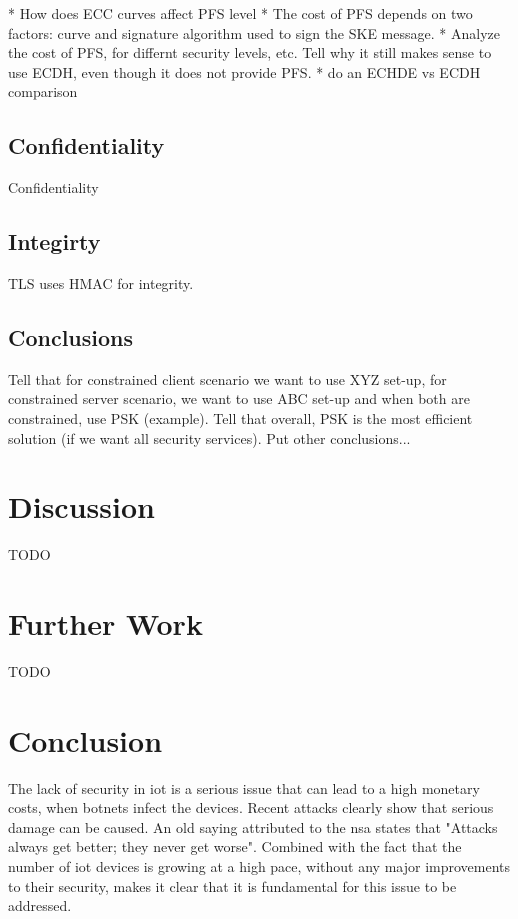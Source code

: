 \documentclass{llncs}
\begin{document}
* How does ECC curves affect PFS level
* The cost of PFS depends on two factors: curve and signature algorithm used to sign the SKE message.
* Analyze the cost of PFS, for differnt security levels, etc. Tell why it still makes sense to use ECDH, even though
it does not provide PFS.
* do an ECHDE vs ECDH comparison


\subsection{Confidentiality}

Confidentiality

\subsection{Integirty}

TLS uses HMAC for integrity.

\subsection{Conclusions}

Tell that for constrained client scenario we want to use XYZ set-up, for constrained server scenario, we want to use
ABC set-up and when both are constrained, use PSK (example). Tell that overall, PSK is the most efficient solution
(if we want all security services). Put other conclusions...



\section{Discussion}

TODO

\section{Further Work}

TODO

\section{Conclusion} 
 
The lack of security in \gls{iot} is a serious issue that can lead to a high monetary costs,
when botnets infect the devices. Recent
attacks clearly show that serious damage can be caused. An old saying attributed to the
\gls{nsa} states that "Attacks always get better; they never get worse".
Combined with the fact that the number of \gls{iot} devices is growing at a high
pace, without any major improvements to their security, makes it clear
that it is fundamental for this issue to be addressed.
\end{document}
